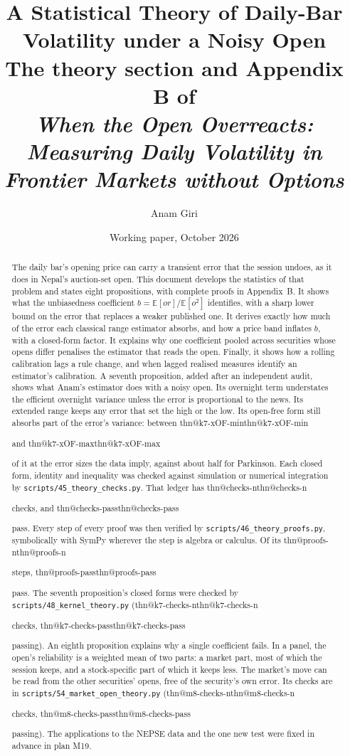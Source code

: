\documentclass[11pt]{article}
\title{A Statistical Theory of Daily-Bar Volatility under a Noisy Open\\[4pt]
\large The theory section and Appendix B of\\ \emph{When the Open Overreacts: Measuring Daily Volatility in Frontier Markets without Options}}
\author{Anam Giri}
\date{Working paper, October 2026}
\makeatletter
\theoremstyle{plain}
\theoremstyle{definition}
\theoremstyle{remark}
\newcommand{\thn}[1]{\ifcsname thn@#1\endcsname\csname thn@#1\endcsname\else
  \PackageError{theory}{Undefined generated number '#1'}{Run scripts/45_theory_checks.py}\fi}
\newcommand{\E}{\mathbb{E}}
\makeatother
\begin{document}
\maketitle

\begin{abstract}
\noindent
The daily bar's opening price can carry a transient error that the session undoes, as it does in
Nepal's auction-set open. This document develops the statistics of that problem and states eight
propositions, with complete proofs in Appendix~B. It shows what the unbiasedness coefficient
$b=\E[or]/\E[o^2]$ identifies, with a sharp lower bound on the error that replaces a weaker
published one. It derives exactly how much of the error each classical range estimator absorbs,
and how a price band inflates $b$, with a closed-form factor. It explains why one coefficient
pooled across securities whose opens differ penalises the estimator that reads the open. Finally,
it shows how a rolling calibration lags a rule change, and when lagged realised measures identify
an estimator's calibration. A seventh proposition, added after an independent audit, shows what Anam's
estimator does with a noisy open. Its overnight term understates the efficient overnight variance
unless the error is proportional to the news. Its extended range keeps any error that set the high or
the low. Its open-free form still absorbs part of the error's variance: between \thn{k7-xOF-min} and
\thn{k7-xOF-max} of it at the error sizes the data imply, against about half for Parkinson. Each closed form, identity and inequality was checked against
simulation or numerical integration by \texttt{scripts/45\_theory\_checks.py}. That ledger has
\thn{checks-n} checks, and \thn{checks-pass} pass. Every step of every proof was then verified by
\texttt{scripts/46\_theory\_proofs.py}, symbolically with SymPy wherever the step is algebra or
calculus. Of its \thn{proofs-n} steps, \thn{proofs-pass} pass. The seventh proposition's closed forms
were checked by \texttt{scripts/48\_kernel\_theory.py} (\thn{k7-checks-n} checks, \thn{k7-checks-pass}
passing). An eighth proposition explains why a single coefficient fails. In a panel, the open's reliability
is a weighted mean of two parts: a market part, most of which the session keeps, and a stock-specific part of
which it keeps less. The market's move can be read from the other securities' opens, free of the security's
own error. Its checks are in \texttt{scripts/54\_market\_open\_theory.py} (\thn{m8-checks-n} checks,
\thn{m8-checks-pass} passing). The applications to the NEPSE data
and the one new test were fixed in advance in plan M19.
\end{abstract}



\appendix
\setcounter{section}{1}




\end{document}
